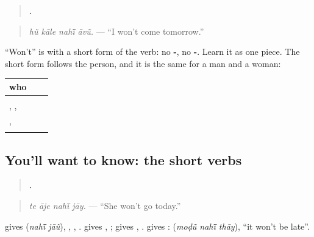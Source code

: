 \begin{grammarlens}[title={Grammar Lens: \gu{નહીં} and a short form}]
\begin{quote}
\textbf{   .}
\end{quote}

\begin{quote}
\emph{hũ kāle nahī̃ āvũ.} — \textquotedblleft{}I won't come tomorrow.\textquotedblright{}
\end{quote}

\textquotedblleft{}Won't\textquotedblright{} is \textbf{} with a short form of the verb: no \textbf{-}, no \textbf{-}. Learn it as one piece. The short form follows the person, and it is the same for a man and a woman:

\noindent
\begin{tabularx}{\linewidth}{@{}>{\raggedright\arraybackslash}X>{\raggedright\arraybackslash}X>{\raggedright\arraybackslash}X@{}}
\toprule
\textbf{who} & \textbf{\gu{આવવું}} & \textbf{\gu{કરવું}} \\
\midrule
\textbf{\gu{હું}} & \textbf{\gu{નહીં} \gu{આવું}} & \textbf{\gu{નહીં} \gu{કરું}} \\
\textbf{\gu{તું}}, \textbf{\gu{તે}}, \textbf{\gu{તેઓ}} & \textbf{\gu{નહીં} \gu{આવે}} & \textbf{\gu{નહીં} \gu{કરે}} \\
\textbf{\gu{અમે}}, \textbf{\gu{આપણે}} & \textbf{\gu{નહીં} \gu{આવીએ}} & \textbf{\gu{નહીં} \gu{કરીએ}} \\
\textbf{\gu{તમે}} & \textbf{\gu{નહીં} \gu{આવો}} & \textbf{\gu{નહીં} \gu{કરો}} \\
\bottomrule
\end{tabularx}
\end{grammarlens}

\subsection*{You'll want to know: the short verbs}
\begin{quote}
\textbf{   .}
\end{quote}

\begin{quote}
\emph{te āje nahī̃ jāy.} — \textquotedblleft{}She won't go today.\textquotedblright{}
\end{quote}

\textbf{} gives \textbf{ } (\emph{nahī̃ jāũ}), \textbf{ }, \textbf{ }, \textbf{ }. \textbf{} gives \textbf{ }, \textbf{ }; \textbf{} gives \textbf{ }, \textbf{ }. \textbf{} gives \textbf{ }: \textbf{  } (\emph{moḍũ nahī̃ thāy}), \textquotedblleft{}it won't be late\textquotedblright{}.

